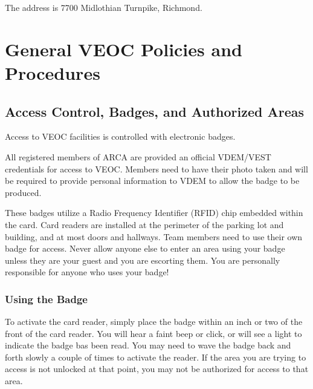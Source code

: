 \documentclass[pdflatex,letterpaper,twoside,12pt]{book}
\begin{document}
The address is 7700 Midlothian Turnpike, Richmond.


\chapter{General VEOC Policies and Procedures}

\section{Access Control, Badges, and Authorized Areas}

Access to VEOC facilities is controlled with electronic badges.

All registered members of ARCA are provided an official VDEM/VEST credentials for access to VEOC.  Members need to have their photo taken and will be required to provide personal information to VDEM to allow the badge to be produced.

These badges utilize a Radio Frequency Identifier (RFID) chip embedded within the card.  Card readers are installed at the perimeter of the parking lot and building, and at most doors and hallways.  Team members need to use their own badge for access.  Never allow anyone else to enter an area using your badge unless they are your guest and you are escorting them.  You are personally responsible for anyone who uses your badge!

\subsection{Using the Badge}

To activate the card reader, simply place the badge within an inch or two of the front of the card reader.  You will hear a faint beep or click, or will see a light to indicate the badge bas been read.  You may need to wave the badge back and forth slowly a couple of times to activate the reader.  If the area you are trying to access is not unlocked at that point, you may not be authorized for access to that area.
\end{document}
